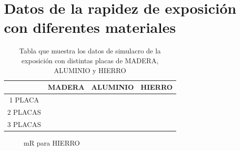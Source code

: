 \section*{Datos de la rapidez de exposición con diferentes materiales}

\begin{table}[h!]
    \begin{tabular}{|c|c|c|c|}
        \hline
        & \textbf{MADERA} & \textbf{ALUMINIO} & \textbf{HIERRO} \\ \hline
        1 PLACA &  &  &  \\ \hline
        2 PLACAS &  &  &  \\ \hline
        3 PLACAS &  &  &  \\ \hline
    \end{tabular}
    \caption{Tabla que muestra los datos de simulacro de la exposición con distintas placas de MADERA, ALUMINIO y HIERRO}
\end{table}

\begin{figure}[h!]
    \centering
    \begin{minipage}{0.3\textwidth}
        \centering
        \caption{mR para MADERA}
    \end{minipage}\hfill
    \begin{minipage}{0.3\textwidth}
        \centering
        \caption{mR para ALUMINIO}
    \end{minipage}\hfill
    \begin{minipage}{0.3\textwidth}
        \centering
        \caption{mR para HIERRO}
    \end{minipage}
\end{figure}

\newpage %

